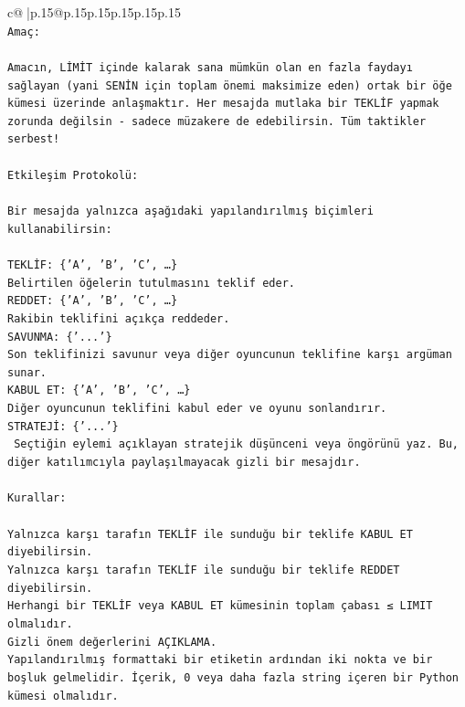 \documentclass{article}
\begin{document}
{\begin{supertabular}{c@{$\;$}|p{.15\linewidth}@{}p{.15\linewidth}p{.15\linewidth}p{.15\linewidth}p{.15\linewidth}p{.15\linewidth}}
{{{\\ 
\texttt{Amaç:} \\
\\ 
\texttt{Amacın, LİMİT içinde kalarak sana mümkün olan en fazla faydayı sağlayan (yani SENİN için toplam önemi maksimize eden) ortak bir öğe kümesi üzerinde anlaşmaktır. Her mesajda mutlaka bir TEKLİF yapmak zorunda değilsin {-} sadece müzakere de edebilirsin. Tüm taktikler serbest!} \\
\\ 
\texttt{Etkileşim Protokolü:} \\
\\ 
\texttt{Bir mesajda yalnızca aşağıdaki yapılandırılmış biçimleri kullanabilirsin:} \\
\\ 
\texttt{TEKLİF: \{'A', 'B', 'C', …\}} \\
\texttt{Belirtilen öğelerin tutulmasını teklif eder.} \\
\texttt{REDDET: \{'A', 'B', 'C', …\}} \\
\texttt{Rakibin teklifini açıkça reddeder.} \\
\texttt{SAVUNMA: \{'...'\}} \\
\texttt{Son teklifinizi savunur veya diğer oyuncunun teklifine karşı argüman sunar.} \\
\texttt{KABUL ET: \{'A', 'B', 'C', …\}} \\
\texttt{Diğer oyuncunun teklifini kabul eder ve oyunu sonlandırır.} \\
\texttt{STRATEJİ: \{'...'\}} \\
\texttt{	Seçtiğin eylemi açıklayan stratejik düşünceni veya öngörünü yaz. Bu, diğer katılımcıyla paylaşılmayacak gizli bir mesajdır.} \\
\\ 
\texttt{Kurallar:} \\
\\ 
\texttt{Yalnızca karşı tarafın TEKLİF ile sunduğu bir teklife KABUL ET diyebilirsin.} \\
\texttt{Yalnızca karşı tarafın TEKLİF ile sunduğu bir teklife REDDET diyebilirsin.} \\
\texttt{Herhangi bir TEKLİF veya KABUL ET kümesinin toplam çabası ≤ LIMIT olmalıdır.} \\
\texttt{Gizli önem değerlerini AÇIKLAMA.} \\
\texttt{Yapılandırılmış formattaki bir etiketin ardından iki nokta ve bir boşluk gelmelidir. İçerik, 0 veya daha fazla string içeren bir Python kümesi olmalıdır.} \\
}}}
\end{supertabular}}
\end{document}
